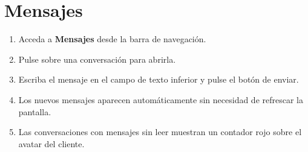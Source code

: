 \section{Mensajes}

\begin{enumerate}
  \item Acceda a \textbf{Mensajes} desde la barra de navegación.
  \item Pulse sobre una conversación para abrirla.
  \item Escriba el mensaje en el campo de texto inferior y pulse el botón de enviar.
  \item Los nuevos mensajes aparecen automáticamente sin necesidad de refrescar la pantalla.
  \item Las conversaciones con mensajes sin leer muestran un contador rojo sobre el avatar del cliente.
\end{enumerate}
